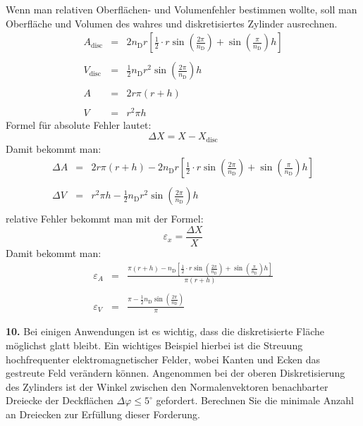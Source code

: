 \documentclass[Protokollheft.tex]{subfiles}
\begin{document}
  Wenn man relativen Oberflächen- und Volumenfehler bestimmen wollte, soll man Oberfläche und Volumen des wahres und diskretisiertes Zylinder ausrechnen.
  \begin{eqnarray*}
  	A_\text{disc}&=&2n_\text{D}r\left[ \frac12 \cdot r \sin\left(\frac{2 \pi}{n_\text{D}}\right)+ \sin\left(\frac{\pi}{n_\text{D}}\right)h  \right]\\
  	\\
  	V_\text{disc}&=&\frac12 n_\text{D} r^2 \sin\left(\frac{ 2\pi}{n_\text{D}}\right)h\\
  	\\
  	A&=&2 r \pi (r+h)\\
  	\\
  	V&=&r^2\pi h
  \end{eqnarray*}
  Formel für absolute Fehler lautet:\\
  $$\Delta X = X- X_\text{disc}$$
  Damit bekommt man:
  \begin{eqnarray*}
  	\Delta A&=&2 r \pi (r+h) -2n_\text{D}r\left[ \frac12 \cdot r \sin\left(\frac{2 \pi}{n_\text{D}}\right)+ \sin\left(\frac{\pi}{n_\text{D}}\right)h  \right]\\
  	\\
  	\Delta V&=&r^2\pi h -\frac12 n_\text{D} r^2 \sin\left(\frac{ 2\pi}{n_\text{D}}\right)h\\
  \end{eqnarray*}
	relative Fehler bekommt man mit der Formel:
  	$$\varepsilon_{x}=\frac{\Delta X}{X}$$
  	Damit bekommt man:
  	\begin{eqnarray*}
  	\varepsilon_{A}&=&\frac{ \pi (r+h) -n_\text{D}\left[ \frac12 \cdot r \sin\left(\frac{2 \pi}{n_\text{D}}\right)+ \sin\left(\frac{\pi}{n_\text{D}}\right)h  \right]}{\pi (r+h)}\\
  	\\
  	\varepsilon_{V}&=&\frac{\pi  -\frac12 n_\text{D}  \sin\left(\frac{ 2\pi}{n_\text{D}}\right)}{\pi}
  \end{eqnarray*}
    \begin{framed}
	\noindent \textbf{10.} Bei einigen Anwendungen ist es wichtig, dass die diskretisierte Fläche möglichst glatt bleibt. Ein
          wichtiges Beispiel hierbei ist die Streuung hochfrequenter elektromagnetischer Felder, wobei
          Kanten und Ecken das gestreute Feld verändern können. Angenommen bei der oberen
          Diskretisierung des Zylinders ist der Winkel zwischen den Normalenvektoren benachbarter Dreiecke der Deckflächen $\Delta \varphi \leq 5^{\circ}$ gefordert.
          Berechnen Sie die minimale Anzahl an Dreiecken zur Erfüllung dieser Forderung.\label{exer:smoothArea}
\end{framed}
\end{document}
